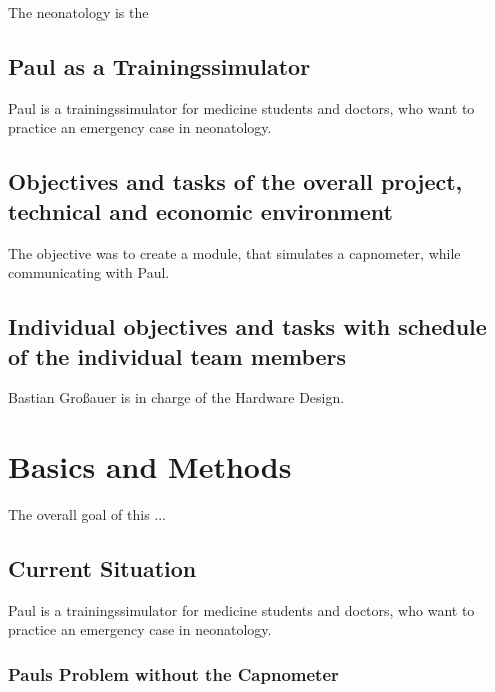 \documentclass[12pt]{article}
\begin{document}
The neonatology is the


\subsection{Paul as a Trainingssimulator}

Paul is a trainingssimulator for medicine students and doctors, who want to practice
an emergency case in neonatology.


\subsection{Objectives and tasks of the overall project, technical and economic environment}

The objective was to create a module, that simulates a capnometer, while communicating
with Paul.


\subsection{Individual objectives and tasks with schedule of the individual team members}

Bastian Großauer is in charge of the Hardware Design.

\pagebreak




\section{Basics and Methods}                                                               %

The overall goal of this ...


\subsection{Current Situation}

Paul is a trainingssimulator for medicine students and doctors, who want to practice
an emergency case in neonatology.


\subsubsection{Pauls Problem without the Capnometer}
\end{document}
